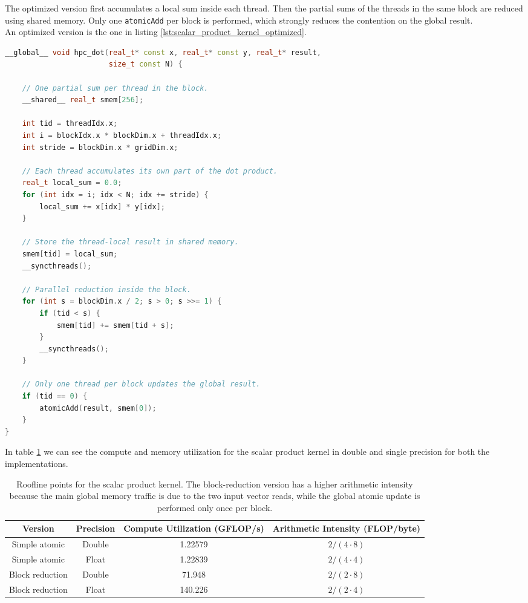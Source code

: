 \documentclass[unicode,10pt,a4paper,oneside,numbers=endperiod,openany]{scrartcl}
\begin{document}
The optimized version first accumulates a local sum inside each thread. Then the
partial sums of the threads in the same block are reduced using shared memory.
Only one \texttt{atomicAdd} per block is performed, which strongly reduces the
contention on the global result.\\
An optimized version is the one in listing \ref{lst:scalar_product_kernel_optimized}.
\begin{lstlisting}[style=grayverbatim,caption={Optimized CUDA kernel for the scalar product.},language=C++,label={lst:scalar_product_kernel_optimized}]
__global__ void hpc_dot(real_t* const x, real_t* const y, real_t* result,
                        size_t const N) {

    // One partial sum per thread in the block.
    __shared__ real_t smem[256];

    int tid = threadIdx.x;
    int i = blockIdx.x * blockDim.x + threadIdx.x;
    int stride = blockDim.x * gridDim.x;

    // Each thread accumulates its own part of the dot product.
    real_t local_sum = 0.0;
    for (int idx = i; idx < N; idx += stride) {
        local_sum += x[idx] * y[idx];
    }

    // Store the thread-local result in shared memory.
    smem[tid] = local_sum;
    __syncthreads();

    // Parallel reduction inside the block.
    for (int s = blockDim.x / 2; s > 0; s >>= 1) {
        if (tid < s) {
            smem[tid] += smem[tid + s];
        }
        __syncthreads();
    }

    // Only one thread per block updates the global result.
    if (tid == 0) {
        atomicAdd(result, smem[0]);
    }
}
\end{lstlisting}
In table \ref{tab:scalar_product_double} we can see the compute and memory utilization for the scalar product kernel in double and single precision for both the implementations.

\begin{table}[!h]
\centering
\begin{tabular}{|c|c|c|c|}
\hline
Version & Precision & Compute Utilization (GFLOP/s) & Arithmetic Intensity (FLOP/byte) \\
\hline
Simple atomic & Double & 1.22579 & $2/(4\cdot 8)$ \\
Simple atomic & Float  & 1.22839 & $2/(4\cdot 4)$ \\
Block reduction & Double & 71.948 & $2/(2\cdot 8)$ \\
Block reduction & Float  & 140.226 & $2/(2\cdot 4)$ \\
\hline
\end{tabular}
\caption{Roofline points for the scalar product kernel. The block-reduction version has a higher arithmetic intensity because the main global memory traffic is due to the two input vector reads, while the global atomic update is performed only once per block.}
\label{tab:scalar_product_double}
\end{table}
\end{document}
